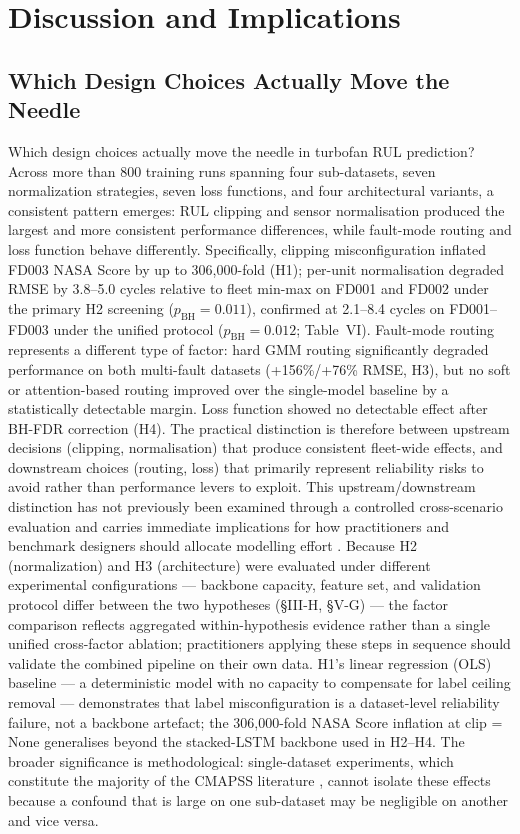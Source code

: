 \documentclass[review,12pt]{elsarticle}
\begin{document}
\section{Discussion and Implications}

\subsection{Which Design Choices Actually Move the Needle}

Which design choices actually move the needle in turbofan RUL prediction? Across more than 800 training runs spanning four sub-datasets, seven normalization strategies, seven loss functions, and four architectural variants, a consistent pattern emerges: RUL clipping and sensor normalisation produced the largest and more consistent performance differences, while fault-mode routing and loss function behave differently. Specifically, clipping misconfiguration inflated FD003 NASA Score by up to 306,000-fold (H1); per-unit normalisation degraded RMSE by 3.8--5.0 cycles relative to fleet min-max on FD001 and FD002 under the primary H2 screening ($p_\text{BH} = 0.011$), confirmed at 2.1--8.4 cycles on FD001--FD003 under the unified protocol ($p_\text{BH} = 0.012$; Table~VI). Fault-mode routing represents a different type of factor: hard GMM routing significantly degraded performance on both multi-fault datasets (+156\%/+76\% RMSE, H3), but no soft or attention-based routing improved over the single-model baseline by a statistically detectable margin. Loss function showed no detectable effect after BH-FDR correction (H4). The practical distinction is therefore between upstream decisions (clipping, normalisation) that produce consistent fleet-wide effects, and downstream choices (routing, loss) that primarily represent reliability risks to avoid rather than performance levers to exploit. This upstream/downstream distinction has not previously been examined through a controlled cross-scenario evaluation and carries immediate implications for how practitioners and benchmark designers should allocate modelling effort \cite{ref05,ref06}. Because H2 (normalization) and H3 (architecture) were evaluated under different experimental configurations --- backbone capacity, feature set, and validation protocol differ between the two hypotheses (\S{}III-H, \S{}V-G) --- the factor comparison reflects aggregated within-hypothesis evidence rather than a single unified cross-factor ablation; practitioners applying these steps in sequence should validate the combined pipeline on their own data. H1's linear regression (OLS) baseline --- a deterministic model with no capacity to compensate for label ceiling removal --- demonstrates that label misconfiguration is a dataset-level reliability failure, not a backbone artefact; the 306,000-fold NASA Score inflation at clip = None generalises beyond the stacked-LSTM backbone used in H2--H4. The broader significance is methodological: single-dataset experiments, which constitute the majority of the CMAPSS literature \cite{ref09,ref14,ref15}, cannot isolate these effects because a confound that is large on one sub-dataset may be negligible on another and vice versa.
\end{document}
